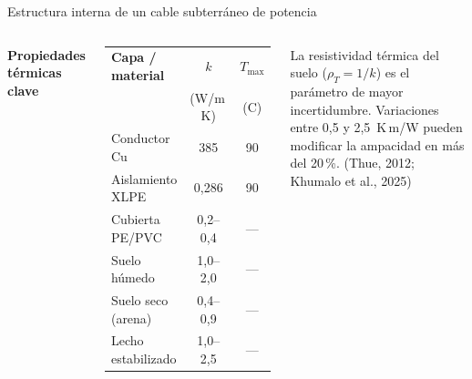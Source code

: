 \documentclass[aspectratio=169]{beamer}
\newcommand{\refcite}[1]{{\footnotesize\color{gray!70!black} #1}}
\begin{document}
\begin{frame}{Estructura interna de un cable subterráneo de potencia}
\begin{columns}[T]
\small\textbf{Propiedades térmicas clave}
\vspace{0.15em}
\begin{center}\scriptsize
\begin{tabular}{lcc}
\toprule
\textbf{Capa / material} & \textbf{$k$} & \textbf{$T_{\max}$}\\
                         & (W/m\,K)     & (\textdegree{}C)\\
\midrule
Conductor Cu        & 385          & 90 \\
Aislamiento XLPE    & 0{,}286      & 90 \\
Cubierta PE/PVC     & 0{,}2--0{,}4 & --- \\
Suelo húmedo        & 1{,}0--2{,}0 & --- \\
Suelo seco (arena)  & 0{,}4--0{,}9 & --- \\
Lecho estabilizado  & 1{,}0--2{,}5 & --- \\
\bottomrule
\end{tabular}
\end{center}
\vspace{0.2em}
\begin{alertblock}{}\scriptsize
La resistividad térmica del suelo ($\rho_T = 1/k$) es el parámetro de
mayor incertidumbre. Variaciones entre 0{,}5 y 2{,}5~K\,m/W pueden
modificar la ampacidad en más del 20\,\%.
\refcite{(Thue, 2012; Khumalo et al., 2025)}
\end{alertblock}
\end{columns}
\end{frame}
\end{document}
